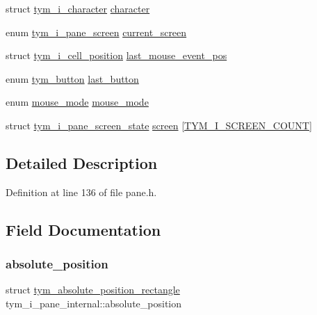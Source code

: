\begin{DoxyCompactItemize}
\item 
struct \hyperlink{structtym__i__character}{tym\+\_\+i\+\_\+character} \hyperlink{structtym__i__pane__internal_a019ad181f81cb30eca1396c630b6e4be}{character}
\item 
enum \hyperlink{pane_8h_a49f1d9b192f4f01ff444123abde24761}{tym\+\_\+i\+\_\+pane\+\_\+screen} \hyperlink{structtym__i__pane__internal_a7ec548dbe248ba7f654569127819dc3c}{current\+\_\+screen}
\item 
struct \hyperlink{structtym__i__cell__position}{tym\+\_\+i\+\_\+cell\+\_\+position} \hyperlink{structtym__i__pane__internal_a89ad2bf59a75b2813352bc070e039f04}{last\+\_\+mouse\+\_\+event\+\_\+pos}
\item 
enum \hyperlink{libttymultiplex_8h_a9223cca7368df5ee528dec0bfa0c3ab3}{tym\+\_\+button} \hyperlink{structtym__i__pane__internal_adaeb64342d1a99fa26110a0f41993326}{last\+\_\+button}
\item 
enum \hyperlink{pane_8h_a271f5b51a492d1598aad17ccd8ebd0c4}{mouse\+\_\+mode} \hyperlink{structtym__i__pane__internal_a55eb70f7a40f96f3348dc1690e9c53c2}{mouse\+\_\+mode}
\item 
struct \hyperlink{structtym__i__pane__screen__state}{tym\+\_\+i\+\_\+pane\+\_\+screen\+\_\+state} \hyperlink{structtym__i__pane__internal_a169132da2187f1791ae9252c63b7321a}{screen} \mbox{[}\hyperlink{pane_8h_a49f1d9b192f4f01ff444123abde24761a4675b455ce9ebdc1c317e91e0c66e5e0}{T\+Y\+M\+\_\+\+I\+\_\+\+S\+C\+R\+E\+E\+N\+\_\+\+C\+O\+U\+NT}\mbox{]}
\end{DoxyCompactItemize}


\subsection{Detailed Description}


Definition at line 136 of file pane.\+h.



\subsection{Field Documentation}
\mbox{\label{structtym__i__pane__internal_a05be638aab84faf85b300b6021b772d8}} 
\subsubsection{\texorpdfstring{absolute\+\_\+position}{absolute\_position}}
{\footnotesize\ttfamily struct \hyperlink{structtym__absolute__position__rectangle}{tym\+\_\+absolute\+\_\+position\+\_\+rectangle} tym\+\_\+i\+\_\+pane\+\_\+internal\+::absolute\+\_\+position}



